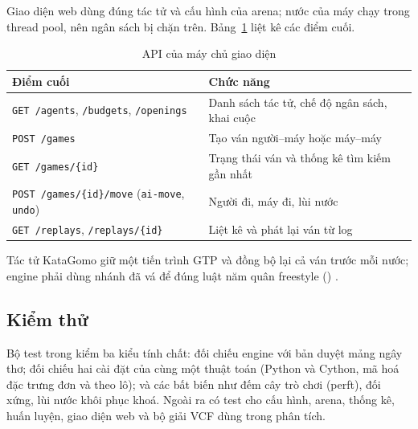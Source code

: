 Giao diện web dùng đúng tác tử và cấu hình của arena; nước của máy chạy trong thread pool, nên ngân sách bị chặn trên.
Bảng~\ref{tab:cs-api} liệt kê các điểm cuối.
\begin{table}[H]
  \centering\small
  \caption{API của máy chủ giao diện}
  \label{tab:cs-api}
  \begin{tabular}{p{6.4cm}p{8cm}}
    \toprule
    Điểm cuối & Chức năng\\
    \midrule
    \texttt{GET /agents}, \texttt{/budgets}, \texttt{/openings} & Danh sách tác tử, chế độ ngân sách, khai cuộc\\
    \texttt{POST /games} & Tạo ván người--máy hoặc máy--máy\\
    \texttt{GET /games/\{id\}} & Trạng thái ván và thống kê tìm kiếm gần nhất\\
    \texttt{POST /games/\{id\}/move} (\texttt{ai-move}, \texttt{undo}) & Người đi, máy đi, lùi nước\\
    \texttt{GET /replays}, \texttt{/replays/\{id\}} & Liệt kê và phát lại ván từ log\\
    \bottomrule
  \end{tabular}
\end{table}
Tác tử KataGomo giữ một tiến trình GTP và đồng bộ lại cả ván trước mỗi nước; engine phải dùng nhánh đã vá để đúng luật
năm quân freestyle () \cite{katagomo}.

\subsection{Kiểm thử}
Bộ test trong  kiểm ba kiểu tính chất: đối chiếu engine với bản duyệt mảng ngây thơ; đối chiếu hai cài
đặt của cùng một thuật toán (Python và Cython, mã hoá đặc trưng đơn và theo lô); và các bất biến như đếm cây trò chơi
(perft), đối xứng, lùi nước khôi phục khoá. Ngoài ra có test cho cấu hình, arena, thống kê, huấn luyện, giao diện web
và bộ giải VCF dùng trong phân tích.
